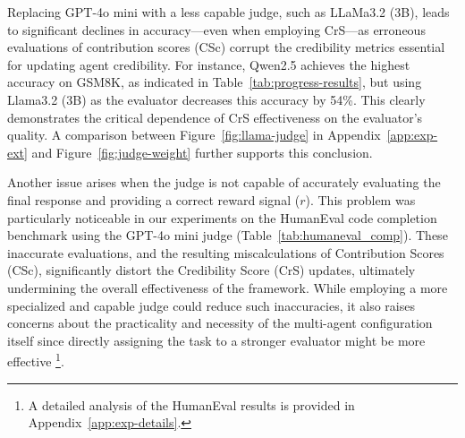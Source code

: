 Replacing GPT-4o mini with a less capable judge, such as LLaMa3.2 (3B), leads to significant declines in accuracy—even when employing CrS—as erroneous evaluations of contribution scores (CSc) corrupt the credibility metrics essential for updating agent credibility. For instance, Qwen2.5 achieves the highest accuracy on GSM8K, as indicated in Table~\ref{tab:progress-results}, but using Llama3.2 (3B) as the evaluator decreases this accuracy by 54\%. This clearly demonstrates the critical dependence of CrS effectiveness on the evaluator's quality. A comparison between Figure~\ref{fig:llama-judge} in Appendix~\ref{app:exp-ext} and Figure~\ref{fig:judge-weight} further supports this conclusion.

Another issue arises when the judge is not capable of accurately evaluating the final response and providing a correct reward signal ($r$). This problem was particularly noticeable in our experiments on the HumanEval code completion benchmark using the GPT-4o mini judge (Table~\ref{tab:humaneval_comp}). These inaccurate evaluations, and the resulting miscalculations of Contribution Scores (CSc), significantly distort the Credibility Score (CrS) updates, ultimately undermining the overall effectiveness of the framework. While employing a more specialized and capable judge could reduce such inaccuracies, it also raises concerns about the practicality and necessity of the multi-agent configuration itself since directly assigning the task to a stronger evaluator might be more effective \footnote{A detailed analysis of the HumanEval results is provided in Appendix~\ref{app:exp-details}.}.

